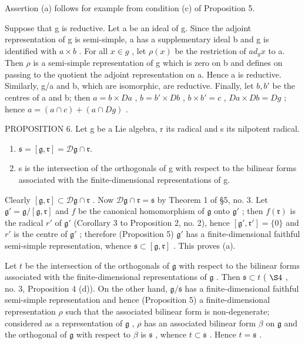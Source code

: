 Assertion (a) follows for example from condition (c) of Proposition 5.

Suppose that g is reductive. Let a be an ideal of g. Since the adjoint representation of g is semi-simple, a has a supplementary ideal b and g is identified with \(a \times b\) . For all \(x \in g\) , let \(\rho(x)\) be the restriction of \(ad_{g}x\) to a. Then \(\rho\) is a semi-simple representation of g which is zero on b and defines on passing to the quotient the adjoint representation on a. Hence a is reductive. Similarly, g/a and b, which are isomorphic, are reductive. Finally, let \(b, b'\) be the centres of a and b; then \(a = b \times Da\) , \(b = b' \times Db\) , \(b \times b' = c\) , \(Da \times Db = Dg\) ; hence \(a = (a \cap c) + (a \cap Dg)\) .

PROPOSITION 6. Let g be a Lie algebra, r its radical and s its nilpotent radical.

\begin{enumerate}
\def\labelenumi{(\alph{enumi})}
\item
  \(\mathfrak{s} = [\mathfrak{g},\mathfrak{r}] = \mathcal{D}\mathfrak{g}\cap \mathfrak{r}.\)
\item
  s is the intersection of the orthogonals of g with respect to the bilinear forms associated with the finite-dimensional representations of g.
\end{enumerate}

Clearly \([\mathfrak{g},\mathfrak{r}]\subset \mathcal{D}\mathfrak{g}\cap \mathfrak{r}\) . Now \(\mathcal{D}\mathfrak{g}\cap \mathfrak{r} = \mathfrak{s}\) by Theorem 1 of §5, no. 3. Let \(\mathfrak{g}' = \mathfrak{g}/[\mathfrak{g},\mathfrak{r}]\) and \(f\) be the canonical homomorphism of \(\mathfrak{g}\) onto \(\mathfrak{g}'\) ; then \(f(\mathfrak{r})\) is the radical \(r'\) of \(\mathfrak{g}'\) (Corollary 3 to Proposition 2, no. 2), hence \([\mathfrak{g}',\mathfrak{r}'] = \{0\}\) and \(r'\) is the centre of \(\mathfrak{g}'\) ; therefore (Proposition 5) \(\mathfrak{g}'\) has a finite-dimensional faithful semi-simple representation, whence \(\mathfrak{s}\subset [\mathfrak{g},\mathfrak{r}]\) . This proves (a).

Let \(t\) be the intersection of the orthogonals of \(\mathfrak{g}\) with respect to the bilinear forms associated with the finite-dimensional representations of \(\mathfrak{g}\) . Then \(\mathfrak{s} \subset t\) ( \(\S 4\) , no. 3, Proposition 4 (d)). On the other hand, \(\mathfrak{g}/\mathfrak{s}\) has a finite-dimensional faithful semi-simple representation and hence (Proposition 5) a finite-dimensional representation \(\rho\) such that the associated bilinear form is non-degenerate; considered as a representation of \(\mathfrak{g}\) , \(\rho\) has an associated bilinear form \(\beta\) on \(\mathfrak{g}\) and the orthogonal of \(\mathfrak{g}\) with respect to \(\beta\) is \(\mathfrak{s}\) , whence \(t \subset \mathfrak{s}\) . Hence \(t = \mathfrak{s}\) .

